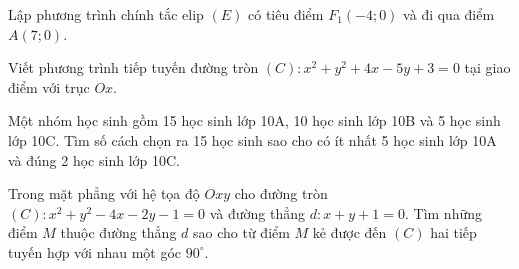 \begin{ex}
Lập phương trình chính tắc elip $(E)$ có tiêu điểm $F_1(-4;0)$ và đi qua điểm $A(7;0)$.
\end{ex}
\begin{ex}
Viết phương trình tiếp tuyến đường tròn $(C)\colon x^2+y^2+4x-5y+3=0$ tại giao điểm với trục $Ox$.
\end{ex}
\begin{ex}
Một nhóm học sinh gồm 15 học sinh lớp 10A, 10 học sinh lớp 10B và 5 học sinh lớp 10C. Tìm số cách chọn ra 15 học sinh sao cho có ít nhất 5 học sinh lớp 10A và đúng 2 học sinh lớp 10C.
\end{ex}
\begin{ex}
Trong mặt phẳng với hệ tọa độ $Oxy$ cho đường tròn $(C)\colon x^2+y^2-4x-2y-1=0$ và đường thẳng $d\colon x+y+1=0$. Tìm những điểm $M$ thuộc đường thẳng $d$ sao cho từ điểm $M$ kẻ được đến $(C)$ hai tiếp tuyến hợp với nhau một góc ${{90}^\circ}$.
\end{ex}

